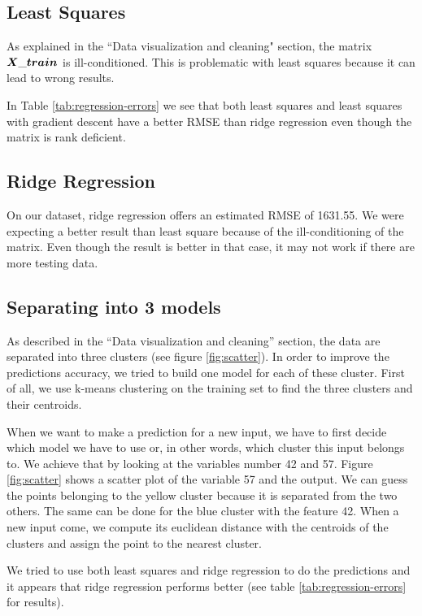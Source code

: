 \documentclass{article} %
\begin{document}
\subsection{Least Squares}
As explained in the ``Data visualization and cleaning" section, the matrix $\boldmath{X\_train}$ is ill-conditioned.
This is problematic with least squares because it can lead to wrong results.

In Table \ref{tab:regression-errors} we see that both least squares and least squares with gradient descent have a better RMSE than ridge regression even though the matrix is rank deficient.

\subsection{Ridge Regression}

On our dataset, ridge regression offers an estimated RMSE of 1631.55. 
We were expecting a better result than least square because of the ill-conditioning of the matrix.
Even though the result is better in that case, it may not work if there are more testing data.

\subsection{Separating into 3 models}

As described in the ``Data visualization and cleaning'' section, the data are separated into three clusters (see figure \ref{fig:scatter}).
In order to improve the predictions accuracy, we tried to build one model for each of these cluster.
First of all, we use k-means clustering on the training set to find the three clusters and their centroids.

When we want to make a prediction for a new input, we have to first decide which model we have to use or, in other words, which cluster this input belongs to.
We achieve that by looking at the variables number 42 and 57. 
Figure \ref{fig:scatter} shows a scatter plot of the variable 57 and the output. We can guess the points belonging to the yellow cluster because it is separated from the two others. The same can be done for the blue cluster with the feature 42.
When a new input come, we compute its euclidean distance with the centroids of the clusters and assign the point to the nearest cluster.

We tried to use both least squares and ridge regression to do the predictions and it appears that ridge regression performs better (see table \ref{tab:regression-errors} for results).
\end{document}
